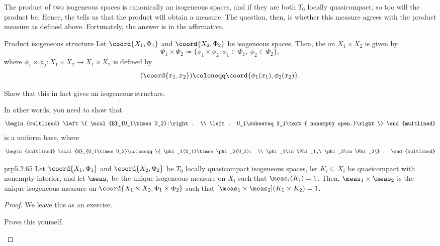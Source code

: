 The product of two isogeneous spaces is canonically an isogeneous spaces, and if they are both $T_0$ locally quasicompact, so too will the product be.  Hence, the  tells us that the product will obtain a measure.  The question, then, is whether this measure agrees with the product measure as defined above.  Fortunately, the answer is in the affirmative.
\begin{dfn}{Product isogeneous structure}{}
Let $\coord{X_1,\Phi _1}$ and $\coord{X_2,\Phi _2}$ be isogeneous spaces.  Then, the  on $X_1\times X_2$ is given by
\begin{equation}
\Phi _1\times \Phi _2\coloneqq \{ \phi _1\times \phi _2:\phi _1\in \Phi _1,\ \phi _2\in \Phi _2\},
\end{equation}
where $\phi _1\times \phi _2:X_1\times X_2\rightarrow X_1\times X_2$ is defined by
\begin{equation}
[\phi _1\times \phi _2](\coord{x_1,x_2})\coloneqq \coord{\phi _1(x_1),\phi _2(x_2)}.
\end{equation}
\begin{exr}[breakable=false]{}{}
Show that this in fact gives an isogeneous structure.
\begin{rmk}
In other words, you need to show that
\begin{equation}
\begin{multlined}
\left\{ \mcal{B}_{U_1\times U_2}:\right. \\ \left. U_i\subseteq X_i\text{ nonempty open.}\right\}
\end{multlined} 
\end{equation}
is a uniform base, where
\begin{equation*}
\begin{multlined}
\mcal{B}_{U_1\times U_2}\coloneqq \{ \phi _1(U_1)\times \phi _2(U_2): \\ \phi _1\in \Phi _1,\ \phi _2\in \Phi _2\} .
\end{multlined}
\end{equation*}
\end{rmk}
\end{exr}
\end{dfn}
\begin{prp}{}{prp5.2.65}
Let $\coord{X_1,\Phi _1}$ and $\coord{X_2,\Phi _2}$ be $T_0$ locally quasicompact isogeneous spaces, let $K_i\subseteq X_i$ be quasicompact with nonempty interior, and let $\meas _i$ be the unique isogeneous measure on $X_i$ such that $\meas _i(K_i)=1$.  Then, $\meas _1\times \meas _2$ is the unique isogeneous measure on $\coord{X_1\times X_2,\Phi _1\times \Phi _2}$ such that $[\meas _1\times \meas _2](K_1\times K_2)=1$.
\begin{proof}
We leave this as an exercise.
\begin{exr}[breakable=false]{}{}
Prove this yourself.
\end{exr}
\end{proof}
\end{prp}

